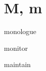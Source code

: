 \section{M, m}

\begin{DefWord}{monologue}
\end{DefWord}

\begin{DefWord}{monitor}
\end{DefWord}

\begin{DefWord}{maintain}
\end{DefWord}